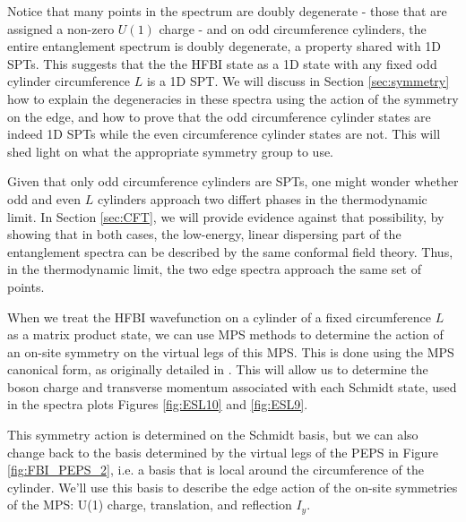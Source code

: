 
Notice that many points in the spectrum are doubly degenerate - those that are
assigned a non-zero $U(1)$ charge - and on odd circumference cylinders, the
entire entanglement spectrum is doubly degenerate, a property shared with 1D SPTs. This suggests that the the HFBI state as a 1D state with any
fixed odd cylinder circumference $L$ is a 1D SPT. We will discuss in
Section \ref{sec:symmetry} how to explain the degeneracies in these spectra
using the action of the symmetry on the edge, and how to prove that the odd
circumference cylinder states are indeed 1D SPTs while the even circumference
cylinder states are not. This will shed light on what the appropriate symmetry
group to use.

Given that only odd circumference cylinders are SPTs, one might wonder whether
odd and even $L$ cylinders approach two differt phases in the thermodynamic
limit. In Section \ref{sec:CFT}, we will provide evidence against that
possibility, by showing that in both cases, the low-energy, linear dispersing
part of the entanglement spectra can be described by the same conformal field
theory. Thus, in the thermodynamic limit, the two edge spectra approach the
same set of points.

When we treat the HFBI wavefunction on a
cylinder of a fixed circumference $L$ as a matrix product state, we can use
MPS methods to determine the action of an on-site symmetry on
the virtual legs of this MPS. This is done using the MPS canonical form, as
originally detailed in \cite{perezgarcia2008}. This will allow us to determine
the boson charge and transverse momentum associated with each Schmidt state,
used in the spectra plots Figures \ref{fig:ESL10} and \ref{fig:ESL9}.

This symmetry action is determined on the Schmidt basis, but we can also
change back to the basis determined by the virtual legs of the PEPS in Figure
\ref{fig:FBI_PEPS_2}, i.e. a basis that is local around the circumference of
the cylinder. We'll use this basis to describe the edge action of the on-site
symmetries of the MPS: U(1) charge, translation, and reflection $I_y$.

